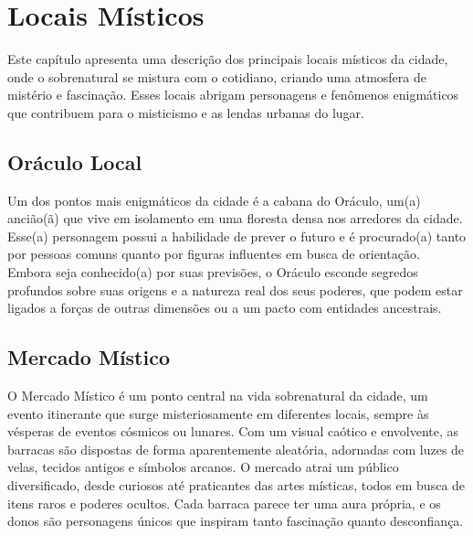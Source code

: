 \chapter{Locais Místicos}

Este capítulo apresenta uma descrição dos principais locais místicos da cidade, onde o sobrenatural se mistura com o cotidiano, criando uma atmosfera de mistério e fascinação. Esses locais abrigam personagens e fenômenos enigmáticos que contribuem para o misticismo e as lendas urbanas do lugar.

\section{Oráculo Local}
Um dos pontos mais enigmáticos da cidade é a cabana do Oráculo, um(a) ancião(ã) que vive em isolamento em uma floresta densa nos arredores da cidade. Esse(a) personagem possui a habilidade de prever o futuro e é procurado(a) tanto por pessoas comuns quanto por figuras influentes em busca de orientação. Embora seja conhecido(a) por suas previsões, o Oráculo esconde segredos profundos sobre suas origens e a natureza real dos seus poderes, que podem estar ligados a forças de outras dimensões ou a um pacto com entidades ancestrais.



\section{Mercado Místico}

O Mercado Místico é um ponto central na vida sobrenatural da cidade, um evento itinerante que surge misteriosamente em diferentes locais, sempre às vésperas de eventos cósmicos ou lunares. Com um visual caótico e envolvente, as barracas são dispostas de forma aparentemente aleatória, adornadas com luzes de velas, tecidos antigos e símbolos arcanos. O mercado atrai um público diversificado, desde curiosos até praticantes das artes místicas, todos em busca de itens raros e poderes ocultos. Cada barraca parece ter uma aura própria, e os donos são personagens únicos que inspiram tanto fascinação quanto desconfiança.

